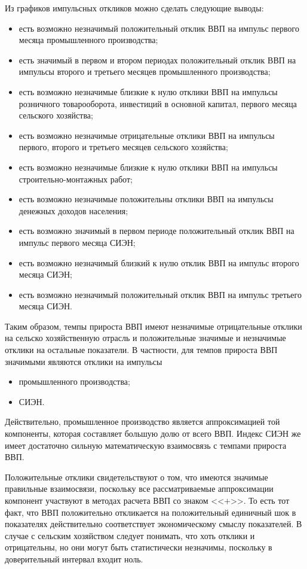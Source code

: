 \documentclass[a4paper, 14pt]{extreport}
\numberwithin{equation}{section}
\numberwithin{equation}{section}
\begin{document}
	Из графиков импульсных откликов можно сделать следующие выводы:
	\begin{itemize}
		\item есть возможно незначимый положительный отклик ВВП на импульс первого месяца промышленного производства;
		\item есть значимый в первом и втором периодах положительный отклик ВВП на импульсы второго и третьего месяцев промышленного производства;
		
		\item есть возможно незначимые близкие к нулю отклики ВВП на импульсы розничного товарооборота, инвестиций в основной капитал, первого месяца сельского хозяйства;
		
		\item есть возможно незначимые отрицательные отклики ВВП на импульсы первого, второго и третьего месяцев сельского хозяйства;
		
		\item есть возможно незначимые близкие к нулю отклики ВВП на импульсы строительно-монтажных работ;
		
		\item есть возможно незначимые положительны отклики ВВП на импульсы денежных доходов населения; 
		
		\item есть возможно значимый в первом периоде положительный отклик ВВП на импульс первого месяца СИЭН;
		\item есть возможно незначимый близкий к нулю отклик ВВП на импульс второго месяца СИЭН;
		\item есть возможно незначимый положительный отклик ВВП на импульс третьего месяца СИЭН. 
	\end{itemize}
	
	Таким образом, темпы прироста ВВП имеют незначимые отрицательные отклики на сельско хозяйственную отрасль и положительные значимые и незначимые отклики на остальные показатели. В частности, для темпов прироста ВВП значимыми являются отклики на импульсы
	\begin{itemize}
		\item промышленного производства;
		\item СИЭН.
	\end{itemize}
	Действительно, промышленное производство является аппроксимацией той компоненты, которая составляет большую долю от всего ВВП. Индекс СИЭН же имеет достаточно сильную математическую взаимосвязь с темпами прироста ВВП.
	
	Положительные отклики свидетельствуют о том, что имеются значимые правильные взаимосвязи, поскольку все рассматриваемые аппроксимации компонент участвуют в методах расчета ВВП со знаком <<$+$>>. То есть тот факт, что ВВП положительно откликается на положительный единичный шок в показателях действительно соответствует экономическому смыслу показателей. В случае с сельским хозяйством следует понимать, что хоть отклики и отрицательны, но они могут быть статистически незначимы, поскольку в доверительный интервал входит ноль.
	
\end{document}
